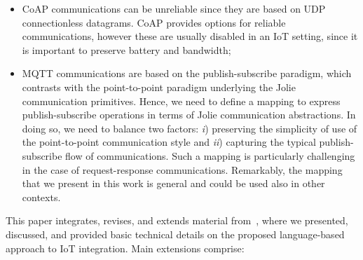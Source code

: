 \begin{itemize}

 \item CoAP communications can be unreliable since they are based on UDP
       connectionless datagrams. CoAP provides options for reliable communications,
       however these are usually disabled in an IoT setting, since it is important to
       preserve battery and bandwidth;

 \item MQTT communications are based on the publish-subscribe paradigm, which
       contrasts with the point-to-point paradigm underlying the Jolie communication
       primitives. Hence, we need to define a mapping to express publish-subscribe
       operations in terms of Jolie communication abstractions. In doing so, we need
       to balance two factors: \emph{i}) preserving the simplicity of use of the
       point-to-point communication style and \emph{ii}) capturing the typical
       publish-subscribe flow of communications. Such a mapping is particularly
       challenging in the case of request-response communications. Remarkably, the
       mapping that we present in this work is general and could be used also in other
       contexts.

\end{itemize}

This paper integrates, revises, and extends material
from~\cite{GabbrielliGLZ18}, where we presented, discussed, and provided basic
technical details on the proposed language-based approach to IoT integration.
Main extensions comprise:

